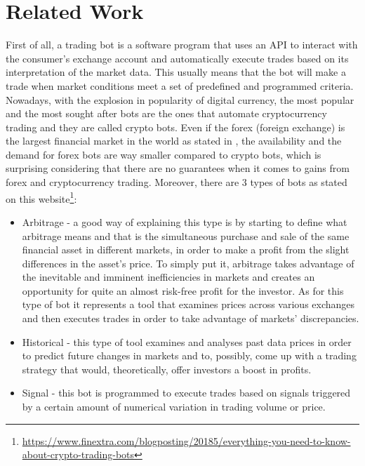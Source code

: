 \documentclass[12pt,a4paper]{report}
\begin{document}
\chapter{Related Work}
First of all, a trading bot is a software program that uses an API to interact with the consumer's exchange account and automatically execute trades based on its interpretation of the market data. This usually means that the bot will make a trade when market conditions meet a set of predefined and programmed criteria. Nowadays, with the explosion in popularity of digital currency, the most popular and the most sought after bots are the ones that automate cryptocurrency trading and they are called crypto bots. Even if the forex (foreign exchange) is the largest financial market in the world as stated in \cite{forex}, the availability and the demand for forex bots are way smaller compared to crypto bots, which is surprising considering that there are no guarantees when it comes to gains from forex and cryptocurrency trading. Moreover, there are 3 types of bots as stated on this website\footnote{\url{https://www.finextra.com/blogposting/20185/everything-you-need-to-know-about-crypto-trading-bots}}:
\begin{itemize}
	\item Arbitrage - a good way of explaining this type is by starting to define what arbitrage means and that is the simultaneous purchase and sale of the same financial asset in different markets, in order to make a profit from the slight differences in the asset's price. To simply put it, arbitrage takes advantage of the inevitable and imminent inefficiencies in markets and creates an opportunity for quite an almost risk-free profit for the investor. 
	As for this type of bot it represents a tool that examines prices across various exchanges and then executes trades in order to take advantage of markets' discrepancies.
	\item Historical - this type of tool examines and analyses past data prices in order to predict future changes in markets and to, possibly, come up with a trading strategy that would, theoretically, offer investors a boost in profits.
	\item Signal - this bot is programmed to execute trades based on signals triggered by a certain amount of numerical variation in trading volume or price.
\end{itemize}
\end{document}
